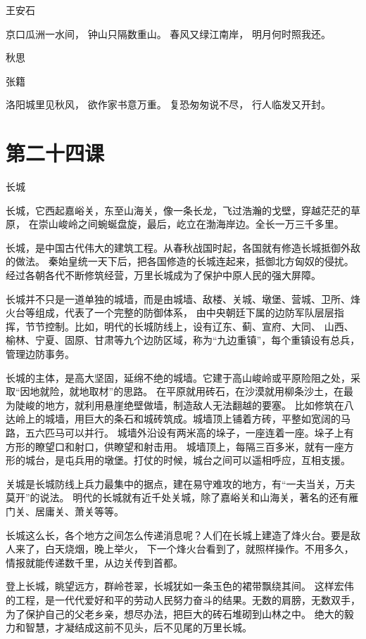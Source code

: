 \documentclass[12pt,UTF8]{ctexbook}
\begin{document}
王安石

京口瓜洲一水间，
钟山只隔数重山。
春风又绿江南岸，
明月何时照我还。

秋思

张籍

洛阳城里见秋风，
欲作家书意万重。
复恐匆匆说不尽，
行人临发又开封。

\section{第二十四课}

长城

长城，它西起嘉峪关，东至山海关，像一条长龙，飞过浩瀚的戈壁，穿越茫茫的草原，
在崇山峻岭之间蜿蜒盘旋，最后，屹立在渤海岸边。全长一万三千多里。

长城，是中国古代伟大的建筑工程。从春秋战国时起，各国就有修造长城抵御外敌的做法。
秦始皇统一天下后，把各国修造的长城连起来，抵御北方匈奴的侵扰。
经过各朝各代不断修筑经营，万里长城成为了保护中原人民的强大屏障。

长城并不只是一道单独的城墙，而是由城墙、敌楼、关城、墩堡、营城、卫所、烽火台等组成，代表了一个完整的防御体系，
由中央朝廷下属的边防军队层层指挥，节节控制。比如，明代的长城防线上，设有辽东、蓟、宣府、大同、
山西、榆林、宁夏、固原、甘肃等九个边防区域，称为“九边重镇”，每个重镇设有总兵，管理边防事务。

长城的主体，是高大坚固，延绵不绝的城墙。它建于高山峻岭或平原险阻之处，采取“因地就险，就地取材”的思路。
在平原就用砖石，在沙漠就用柳条沙土，在最为陡峻的地方，就利用悬崖绝壁做墙，制造敌人无法翻越的要塞。
比如修筑在八达岭上的城墙，用巨大的条石和城砖筑成。城墙顶上铺着方砖，平整如宽阔的马路，五六匹马可以并行。
城墙外沿设有两米高的垛子，一座连着一座。垛子上有方形的瞭望口和射口，供瞭望和射击用。
城墙顶上，每隔三百多米，就有一座方形的城台，是屯兵用的墩堡。打仗的时候，城台之间可以遥相呼应，互相支援。

关城是长城防线上兵力最集中的据点，建在易守难攻的地方，有“一夫当关，万夫莫开”的说法。
明代的长城就有近千处关城，除了嘉峪关和山海关，著名的还有雁门关、居庸关、萧关等等。

长城这么长，各个地方之间怎么传递消息呢？人们在长城上建造了烽火台。要是敌人来了，白天烧烟，晚上举火，
下一个烽火台看到了，就照样操作。不用多久，情报就能传递数千里，从边关传到首都。

登上长城，眺望远方，群岭苍翠，长城犹如一条玉色的裙带飘绕其间。
这样宏伟的工程，是一代代爱好和平的劳动人民努力奋斗的结果。无数的肩膀，无数双手，
为了保护自己的父老乡亲，想尽办法，把巨大的砖石堆砌到山林之中。
绝大的毅力和智慧，才凝结成这前不见头，后不见尾的万里长城。
\end{document}
